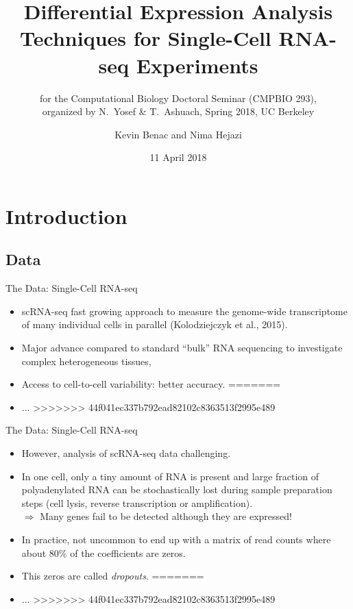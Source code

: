 \documentclass{beamer}
\title[zinbwave-droplasso]{Differential Expression Analysis Techniques for
  Single-Cell RNA-seq Experiments}
\subtitle{\vspace*{0.5em} \scriptsize for the Computational Biology Doctoral
  Seminar (CMPBIO 293),\\ organized by N.~Yosef \& T.~Ashuach, Spring 2018, UC
  Berkeley}
\author{Kevin Benac and Nima Hejazi}
\institute{Group in Biostatistics,\\ University of California, Berkeley}
\date{11 April 2018}
\begin{document}
\begin{frame}
  \titlepage
\end{frame}

\section{Introduction}
\subsection{Data}

\begin{frame}{The Data: Single-Cell RNA-seq}
\begin{itemize}
<<<<<<< HEAD
  \itemsep10pt
  \item scRNA-seq fast growing approach to measure the genome-wide transcriptome of many individual cells in parallel (Kolodziejczyk et al., 2015).
  \item Major advance compared to standard “bulk” RNA sequencing to investigate complex heterogeneous tissues,
  \item Access to cell-to-cell variability: better accuracy.
=======
  \itemsep12pt
  \item ...
>>>>>>> 44f041ec337b792ead82102c8363513f2995e489
\end{itemize}

\end{frame}


\begin{frame}{The Data: Single-Cell RNA-seq}

\begin{itemize}
<<<<<<< HEAD
  \itemsep10pt
  \item However, analysis of scRNA-seq data challenging.
  \item In one cell, only a tiny amount of RNA is present and large fraction of polyadenylated RNA can be stochastically lost during sample preparation steps (cell lysis, reverse transcription or amplification). \\
 $ \Longrightarrow$ Many genes fail to be detected although they are expressed!
  \item In practice, not uncommon to end up with a matrix of read counts where about 80\% of the coefficients are zeros.
  \item This zeros are called \textit{dropouts}.
=======
  \itemsep12pt
  \item ...
>>>>>>> 44f041ec337b792ead82102c8363513f2995e489
\end{itemize}

\end{frame}
\end{document}
